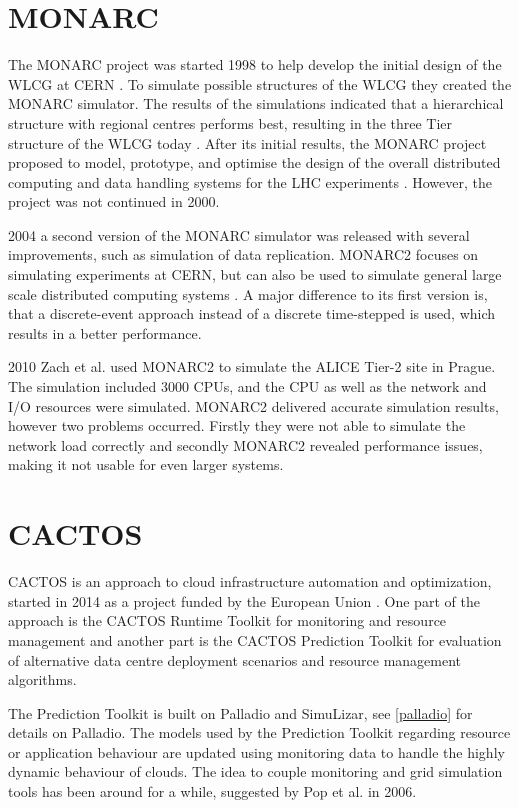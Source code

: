\section{MONARC}
The MONARC project was started 1998 to help develop the initial design of the WLCG at CERN \cite{monarc2000models}.
To simulate possible structures of the WLCG they created the MONARC simulator.
The results of the simulations indicated that a hierarchical structure with regional centres performs best, resulting in the three Tier structure of the WLCG today \cite{morita2001validation}. 
After its initial results, the MONARC project proposed to model, prototype, and optimise the design of the overall distributed computing and data handling systems for the LHC experiments \cite{monarc2000models}.
However, the project was not continued in 2000.

2004 a second version of the MONARC simulator was released with several improvements, such as simulation of data replication. MONARC2 focuses on simulating experiments at CERN, but can also be used to simulate general large scale distributed computing systems \cite{legrand2003monarc}. A major difference to its first version is, that a discrete-event approach instead of a discrete time-stepped is used, which results in a better performance.

2010 Zach et al. \cite{1742-6596-331-7-072038} used MONARC2 to simulate the ALICE Tier-2 site in Prague. The simulation included 3000 CPUs, and the CPU as well as the network and I/O resources were simulated. MONARC2 delivered accurate simulation results, however two problems occurred. Firstly they were not able to simulate the network load correctly and secondly MONARC2 revealed performance issues, making it not usable for even larger systems.
\newpage
\section{CACTOS}
CACTOS is an approach to cloud infrastructure automation and optimization, started in 2014 as a project funded by the European Union \cite{cactos}.
One part of the approach is the CACTOS Runtime Toolkit for monitoring and resource management and another part is the CACTOS Prediction Toolkit for evaluation of alternative data centre deployment scenarios and resource management algorithms.

The Prediction Toolkit is built on Palladio and SimuLizar, see \cref{palladio} for details on Palladio.
The models used by the Prediction Toolkit regarding resource or application behaviour are updated using monitoring data to handle the highly dynamic behaviour of clouds.
The idea to couple monitoring and grid simulation tools has been around for a while, suggested by Pop et al. \cite{1698650} in 2006.

